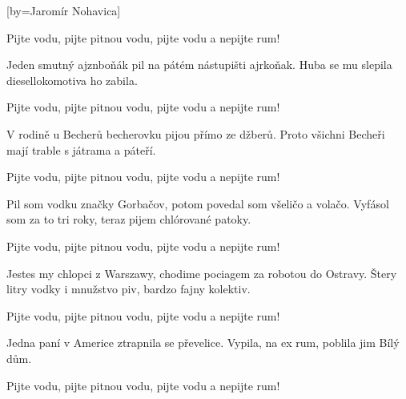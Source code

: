 [by={Jaromír Nohavica}]

\beginchorus{}
\lrep{} Pijte vodu, pijte pitnou vodu, pijte vodu a nepijte rum! \rrep{}
\endchorus{}

\beginverse{}
Jeden smutný ajznboňák pil na pátém nástupišti ajrkoňak.
Huba se mu slepila diesellokomotiva ho zabila.
\endverse{}

\beginchorus{}
\lrep{} Pijte vodu, pijte pitnou vodu, pijte vodu a nepijte rum! \rrep{}
\endchorus{}

\beginverse{}
V rodině u Becherů becherovku pijou přímo ze džberů.
Proto všichni Becheři mají trable s játrama a páteří.
\endverse{}

\beginchorus{}
\lrep{} Pijte vodu, pijte pitnou vodu, pijte vodu a nepijte rum! \rrep{}
\endchorus{}

\beginverse{}
Pil som vodku značky Gorbačov, potom povedal som všeličo a volačo.
Vyfásol som za to tri roky, teraz pijem chlórované patoky.
\endverse{}

\beginchorus{}
\lrep{} Pijte vodu, pijte pitnou vodu, pijte vodu a nepijte rum! \rrep{}
\endchorus{}

\beginverse{}
Jestes my chlopci z Warszawy, chodime pociagem za robotou do Ostravy.
Štery litry vodky i mnužstvo piv, bardzo fajny kolektiv.
\endverse{}

\beginchorus{}
\lrep{} Pijte vodu, pijte pitnou vodu, pijte vodu a nepijte rum! \rrep{}
\endchorus{}

\beginverse{}
Jedna paní v Americe ztrapnila se převelice.
Vypila, na ex rum, poblila jim Bílý dům.
\endverse{}

\beginchorus{}
\lrep{} Pijte vodu, pijte pitnou vodu, pijte vodu a nepijte rum! \rrep{}
\endchorus{}

\endsong{}
